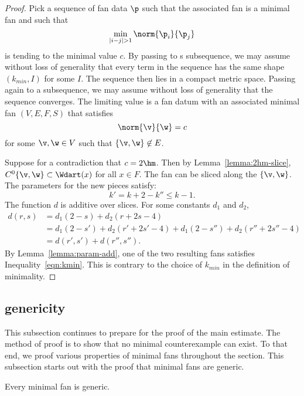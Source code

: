 \begin{proof} 
  Pick a sequence of fan data $\p$ such that the associated fan is a
  minimal fan and such that
\[ 
\min_{|i-j|>1} \norm{\p_i}{\p_j}
\] 
is tending to the minimal value $c$.  By passing to s subsequence, we
may assume without loss of generality that every term in the sequence
has the same shape $(k_{min},I)$ for some $I$.  The sequence then lies
in a compact metric space.  Passing again to a subsequence, we may
assume without loss of generality that the sequence converges.  The
limiting value is a fan datum with an associated minimal fan $(V,E,F,S)$ that
satisfies
\[ 
\norm{\v}{\w}=c
\] 
for some $\v,\w\in V$ such that $\{\v,\w\}\not\in E$.

Suppose for a contradiction that $c=2\hm$.  Then by
Lemma~\ref{lemma:2hm-slice}, $C^0\{\v,\w\}\subset \Wdart(x)$ for all
$x\in F$.  The fan can be sliced along the $\{\v,\w\}$.  The
parameters for the new pieces satisfy:
\[ 
k' = k+2 - k'' \le k-1.
\] 
The function $d$ is additive over slices.  For some constants $d_1$
and $d_2$,
\begin{align}\label{eqn:drs}
d(r,s) &= d_1 (2 - s) + d_2 (r + 2 s-4) \nonumber\\
&= d_1 (2-s') + d_2 (r'+2 s'-4) + d_1 (2-s'') + d_2 (r''+2s''-4)\nonumber\\
&= d(r',s') + d(r'',s'').
\end{align}
By Lemma~\ref{lemma:param-add}, one of the two resulting fans
satisfies Inequality~\ref{eqn:kmin}.  This is contrary to the choice
of $k_{min}$ in the definition of minimality.
\end{proof}





\subsection{genericity}

This subsection continues to prepare for the proof of the main
estimate.  The method of proof is to show that no minimal
counterexample can exist.  To that end, we proof various properties of
minimal fans throughout the section.  This subsection starts out with
the proof that minimal fans are generic.

\begin{lemma}[generic]\label{lemma:circular-nonmin}
Every minimal fan is generic.
\end{lemma}

